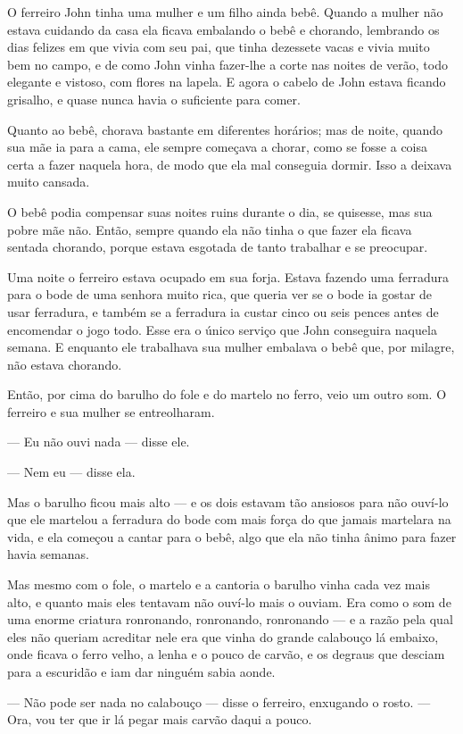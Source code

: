 O ferreiro John tinha uma mulher e um filho ainda bebê. Quando a
mulher não estava cuidando da casa ela ficava embalando o bebê e
chorando, lembrando os dias felizes em que vivia com seu pai, que
tinha dezessete vacas e vivia muito bem no campo, e de como John
vinha fazer-lhe a corte nas noites de verão, todo elegante e vistoso,
com flores na lapela. E agora o cabelo de John estava ficando
grisalho, e quase nunca havia o suficiente para comer.

Quanto ao bebê, chorava bastante em diferentes horários; mas de noite,
quando sua mãe ia para a cama, ele sempre começava a chorar, como se
fosse a coisa certa a fazer naquela hora, de modo que ela mal
conseguia dormir. Isso a deixava muito cansada.

O bebê podia compensar suas noites ruins durante o dia, se quisesse,
mas sua pobre mãe não. Então, sempre quando ela não tinha o que fazer
ela ficava sentada chorando, porque estava esgotada de tanto
trabalhar e se preocupar.

Uma noite o ferreiro estava ocupado em sua forja. Estava fazendo uma
ferradura para o bode de uma senhora muito rica, que queria ver se o
bode ia gostar de usar ferradura, e também se a ferradura ia custar
cinco ou seis pences antes de encomendar o jogo todo. Esse era o
único serviço que John conseguira naquela semana. E enquanto ele
trabalhava sua mulher embalava o bebê que, por milagre, não estava
chorando.

Então, por cima do barulho do fole e do martelo no ferro, veio um
outro som. O ferreiro e sua mulher se entreolharam.

— Eu não ouvi nada — disse ele.

— Nem eu — disse ela. 

Mas o barulho ficou mais alto — e os dois estavam tão ansiosos para
não ouví-lo que ele martelou a ferradura do bode com mais força do
que jamais martelara na vida, e ela começou a cantar para o bebê,
algo que ela não tinha ânimo para fazer havia semanas.

Mas mesmo com o fole, o martelo e a cantoria o barulho vinha cada vez
mais alto, e quanto mais eles tentavam não ouví-lo mais o ouviam. Era
como o som de uma enorme criatura ronronando, ronronando, ronronando
— e a razão pela qual eles não queriam acreditar nele era que vinha
do grande calabouço lá embaixo, onde ficava o ferro velho, a lenha e
o pouco de carvão, e os degraus que desciam para a escuridão e iam
dar ninguém sabia aonde.

— Não pode ser nada no calabouço — disse o ferreiro, enxugando o
rosto. — Ora, vou ter que ir lá pegar mais carvão daqui a pouco.

